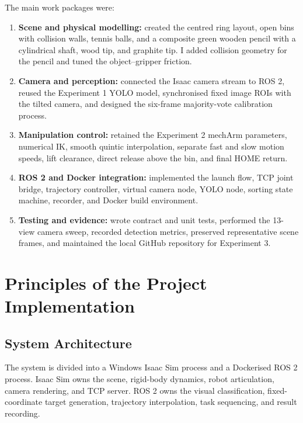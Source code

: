 \documentclass[12pt,a4paper]{article}
\begin{document}
The main work packages were:

\begin{enumerate}
  \item \textbf{Scene and physical modelling:} created the centred ring layout, open bins with collision walls, tennis balls, and a composite green wooden pencil with a cylindrical shaft, wood tip, and graphite tip. I added collision geometry for the pencil and tuned the object--gripper friction.
  \item \textbf{Camera and perception:} connected the Isaac camera stream to ROS 2, reused the Experiment 1 YOLO model, synchronised fixed image ROIs with the tilted camera, and designed the six-frame majority-vote calibration process.
  \item \textbf{Manipulation control:} retained the Experiment 2 mechArm parameters, numerical IK, smooth quintic interpolation, separate fast and slow motion speeds, lift clearance, direct release above the bin, and final HOME return.
  \item \textbf{ROS 2 and Docker integration:} implemented the launch flow, TCP joint bridge, trajectory controller, virtual camera node, YOLO node, sorting state machine, recorder, and Docker build environment.
  \item \textbf{Testing and evidence:} wrote contract and unit tests, performed the 13-view camera sweep, recorded detection metrics, preserved representative scene frames, and maintained the local GitHub repository for Experiment 3.
\end{enumerate}

\section{Principles of the Project Implementation}

\subsection{System Architecture}

The system is divided into a Windows Isaac Sim process and a Dockerised ROS 2 process. Isaac Sim owns the scene, rigid-body dynamics, robot articulation, camera rendering, and TCP server. ROS 2 owns the visual classification, fixed-coordinate target generation, trajectory interpolation, task sequencing, and result recording.
\end{document}
